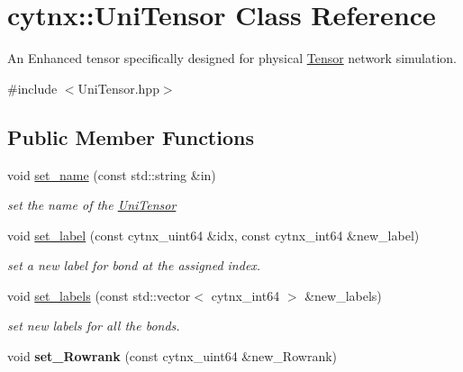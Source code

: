 \hypertarget{classcytnx_1_1UniTensor}{}\section{cytnx\+:\+:Uni\+Tensor Class Reference}
\label{classcytnx_1_1UniTensor}


An Enhanced tensor specifically designed for physical \hyperlink{classcytnx_1_1Tensor}{Tensor} network simulation.  




{\ttfamily \#include $<$Uni\+Tensor.\+hpp$>$}

\subsection*{Public Member Functions}
\begin{DoxyCompactItemize}
\item 
void \hyperlink{classcytnx_1_1UniTensor_ad2ee7e756d5fc9e05faf814b99151544}{set\+\_\+name} (const std\+::string \&in)
\begin{DoxyCompactList}\small\item\em set the name of the \hyperlink{classcytnx_1_1UniTensor}{Uni\+Tensor} \end{DoxyCompactList}\item 
void \hyperlink{classcytnx_1_1UniTensor_a960547851b0811c2417eec7bdd99641d}{set\+\_\+label} (const cytnx\+\_\+uint64 \&idx, const cytnx\+\_\+int64 \&new\+\_\+label)
\begin{DoxyCompactList}\small\item\em set a new label for bond at the assigned index. \end{DoxyCompactList}\item 
void \hyperlink{classcytnx_1_1UniTensor_a6e17d3849392171f61d6bebd5ac2b3f2}{set\+\_\+labels} (const std\+::vector$<$ cytnx\+\_\+int64 $>$ \&new\+\_\+labels)
\begin{DoxyCompactList}\small\item\em set new labels for all the bonds. \end{DoxyCompactList}\item 
\mbox{\label{classcytnx_1_1UniTensor_ae0682945588dd82a4d97a97db49c1b51}} 
void {\bfseries set\+\_\+\+Rowrank} (const cytnx\+\_\+uint64 \&new\+\_\+\+Rowrank)
\item 
\mbox{\label{classcytnx_1_1UniTensor_a8872f2780d7b3dd00608229599a848d2}} 

\end{DoxyCompactItemize}
